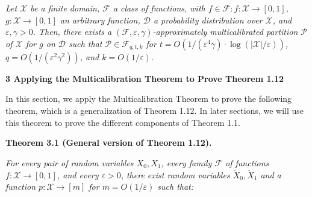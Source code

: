 \documentclass[10pt,a4paper]{article}
\begin{document}
\emph{Let $\mathcal{X}$ be a finite domain, $\mathcal{F}$ a class of functions, with $f\in\mathcal{F}:f:\mathcal{X}\rightarrow[0,1]$, $g:\mathcal{X}\rightarrow[0,1]$ an arbitrary function, $\mathcal{D}$ a probability distribution over $\mathcal{X}$, and $\varepsilon,\gamma>0$. Then, there exists a $(\mathcal{F},\varepsilon,\gamma)$-approximately multicalibrated partition $\mathcal{P}$ of $\mathcal{X}$ for $g$ on $\mathcal{D}$ such that $\mathcal{P}\in\mathcal{F}_{q,t,k}$ for $t=O(1/(\varepsilon^{4}\gamma)\cdot\log(|\mathcal{X}|/\varepsilon))$, $q=O(1/(\varepsilon^{2}\gamma^{2}))$, and $k=O(1/\varepsilon)$.}\par








\par\medskip\noindent\textbf{
3 Applying the Multicalibration Theorem to Prove Theorem 1.12
}\par




In this section, we apply the Multicalibration Theorem to prove the following theorem, which is a generalization of Theorem 1.12. In later sections, we will use this theorem to prove the different components of Theorem 1.1.\par






\par\medskip\noindent\textbf{
\textbf{Theorem 3.1}\textbf{ }(General version of Theorem 1.12)\textbf{.}
}\par



\emph{For every pair of random variables $X_{0},X_{1}$, every family $\mathcal{F}$ of functions $f:\mathcal{X}\to[0,1]$, and every $\varepsilon>0$, there exist random variables $\widetilde{X}_{0},\widetilde{X}_{1}$ and a function $p:\mathcal{X}\to[m]$ for $m=O(1/\varepsilon)$ such that:}\par
\end{document}

